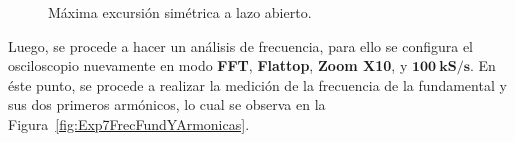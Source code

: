       \begin{figure}[H]
        \centering
          \caption{Máxima excursión simétrica a lazo abierto.}
          \label{fig:Exp7MESLazoAbierto}
      \end{figure}

      Luego, se procede a hacer un análisis de frecuencia, para ello se configura el osciloscopio nuevamente 
      en modo \textbf{FFT}, \textbf{Flattop}, \textbf{Zoom X10}, y $\mathbf{100~kS/s}$. En éste punto, se procede 
      a realizar la medición de la frecuencia de la fundamental y sus dos primeros armónicos, lo cual se observa en la 
      Figura~\ref{fig:Exp7FrecFundYArmonicas}.

